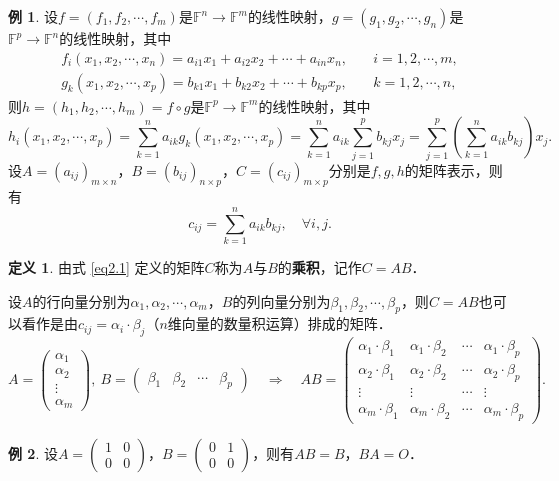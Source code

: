 \documentclass[a4paper,fontset=windows]{ctexbook}
\theoremstyle{definition}
\newtheorem{definition}{定义}[chapter]
\newtheorem{example}{例}[chapter]
\begin{document}
\begin{example}\label{ex2.3}
设$f=(f_1,f_2,\cdots,f_m)$是$\mathbb{F}^n\to\mathbb{F}^m$的线性映射，$g=(g_1,g_2,\cdots,g_n)$是$\mathbb{F}^p\to\mathbb{F}^n$的线性映射，其中
$$\begin{array}{ll}
f_i(x_1,x_2,\cdots,x_n)=a_{i1}x_1+a_{i2}x_2+\cdots+a_{in}x_n,&\quad i=1,2,\cdots,m, \\
g_k(x_1,x_2,\cdots,x_p)=b_{k1}x_1+b_{k2}x_2+\cdots+b_{kp}x_p,&\quad k=1,2,\cdots,n,
\end{array}$$
则$h=(h_1,h_2,\cdots,h_m)=f\circ g$是$\mathbb{F}^p\to\mathbb{F}^m$的线性映射，其中
$$h_i(x_1,x_2,\cdots,x_p)=\sum_{k=1}^na_{ik}g_k(x_1,x_2,\cdots,x_p)=\sum_{k=1}^na_{ik}\sum_{j=1}^pb_{kj}x_j=\sum_{j=1}^p\left(\sum_{k=1}^na_{ik}b_{kj}\right)x_j.$$
设$A=(a_{ij})_{m\times n}$，$B=(b_{ij})_{n\times p}$，$C=(c_{ij})_{m\times p}$分别是$f,g,h$的矩阵表示，则有
\begin{equation}\label{eq2.1}
c_{ij}=\sum_{k=1}^na_{ik}b_{kj},\quad\forall i,j.
\end{equation}
\end{example}

\begin{definition}
由式 \eqref{eq2.1} 定义的矩阵$C$称为$A$与$B$的{\bf 乘积}，记作$C=AB$．
\end{definition}

设$A$的行向量分别为$\alpha_1,\alpha_2,\cdots,\alpha_m$，$B$的列向量分别为$\beta_1,\beta_2,\cdots,\beta_p$，则$C=AB$也可以看作是由$c_{ij}=\alpha_i\cdot\beta_j$（$n$维向量的数量积运算）排成的矩阵．
$$A=\begin{pmatrix}\alpha_1 \\ \alpha_2 \\ \vdots \\ \alpha_m\end{pmatrix},~B=\begin{pmatrix}\beta_1&\beta_2&\cdots&\beta_p\end{pmatrix}\quad\Rightarrow\quad AB=\begin{pmatrix}\alpha_1\cdot\beta_1&\alpha_1\cdot\beta_2&\cdots&\alpha_1\cdot\beta_p \\ \alpha_2\cdot\beta_1&\alpha_2\cdot\beta_2&\cdots&\alpha_2\cdot\beta_p \\ \vdots&\vdots&\cdots&\vdots \\ \alpha_m\cdot\beta_1&\alpha_m\cdot\beta_2&\cdots&\alpha_m\cdot\beta_p\end{pmatrix}.$$

\begin{example}\label{ex2.4}
设$A=\begin{pmatrix}1&0 \\ 0&0\end{pmatrix}$，$B=\begin{pmatrix}0&1 \\ 0&0\end{pmatrix}$，则有$AB=B$，$BA=O$．
\end{example}
\end{document}
